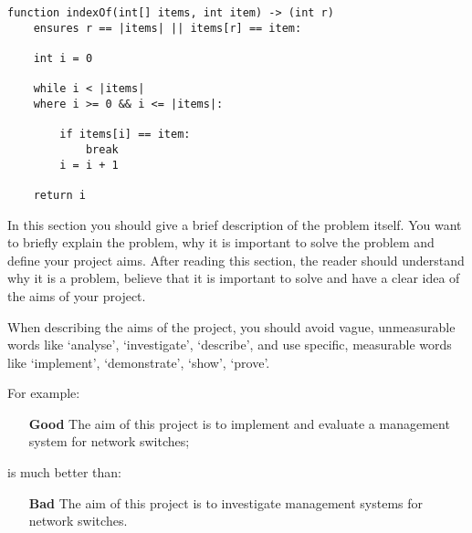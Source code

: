 \documentclass[11pt, a4paper, twoside, openright]{report}
\begin{document}
%
%
\begin{lstlisting}
function indexOf(int[] items, int item) -> (int r)
    ensures r == |items| || items[r] == item:

    int i = 0

    while i < |items|
    where i >= 0 && i <= |items|:

        if items[i] == item:
            break
        i = i + 1

    return i
\end{lstlisting}
In this section you should give a brief description of the problem
itself. You want to briefly explain the problem, why it is important
to solve the problem and define your project aims. After reading this
section, the reader should understand why it is a problem, believe
that it is important to solve and have a clear idea of the aims of
your project.

When describing the aims of the project, you should avoid vague,
unmeasurable words like `analyse', `investigate', `describe', and use
specific, measurable words like `implement', `demonstrate', `show',
`prove'.

For example:

\begin{itemize}
    \item[\bf Good] The aim of this project is to implement and evaluate a
        management system for network switches;
\end{itemize}
is much better than:
\begin{itemize}
    \item[\bf Bad] The aim of this project is to investigate management
        systems for network switches.
\end{itemize}
\end{document}
